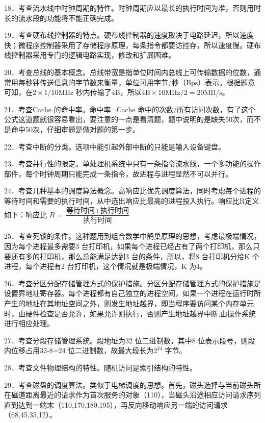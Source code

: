 \documentclass[UTF8,11pt]{ctexart}
\begin{document}
18．考查流水线中时钟周期的特性。时钟周期应以最长的执行时间为准，否则用时长的流水段的功能将不能正确完成。


19．考查硬布线控制器的特点。硬布线控制器的速度取决于电路延迟，所以速度快；微程序控制器采用了存储程序原理，每条指令都要访控存，所以速度慢。硬布线控制器采用专门的逻辑电路实现，修改和扩展困难。


20．考查总线的基本概念。总线带宽是指单位时间内总线上可传输数据的位数，通常用每秒钟传送信息的字节数来衡量，单位可用字节/秒（Bps）表示。根据题意可知，在\(\displaystyle 2\times1/10\text{MHz}\) 秒内传输了4B，所以\(\displaystyle 4\text{B}\times10\text{MHz}/2=20\text{MB/s}\)。


21．考查Cache 的命中率。命中率=Cache 命中的次数/所有访问次数，有了这个公式这道题就很容易看出，要注意的一点是看清题，题中说明的是缺失50次，而不是命中50次，仔细审题是做对题的第一步。


22．考查中断的分类。选项中能引起外部中断的只能是输入设备键盘。


23．考查并行性的限定。单处理机系统中只有一条指令流水线，一个多功能的操作部件，每个时钟周期只能完成一条指令，故进程与进程显然不可以并行。


24．考查几种基本的调度算法概念。高响应比优先调度算法，同时考虑每个进程的等待时间和需要的执行时间，从中选出响应比最高的进程投入执行。响应比R定义如下：响应比 \(\displaystyle R=\dfrac{\displaystyle \text{等待时间}+\text{执行时间}}{\displaystyle \text{执行时间}}\)


25．考查死锁的条件。这种题用到组合数学中鸽巢原理的思想，考虑最极端情况，因为每个进程最多需要3 台打印机，如果每个进程已经占有了两个打印机，那么只要还有多的打印机，那么总能满足达到3 台的条件，所以，将8 台打印机分给K 个进程，每个进程有2 台打印机，这个情况就是极端情况，K 为4。


26．考查分区分配存储管理方式的保护措施。分区分配存储管理方式的保护措施是设置界地址寄存器。每个进程都有自己独立的进程空间，如果一个进程在运行时所产生的地址在其地址空间之外，则发生地址越界，即当程序要访问某个内存单元时，由硬件检查是否允许，如果允许则执行，否则产生地址越界中断,由操作系统进行相应处理。


27．考查分段存储管理系统。段地址为32 位二进制数，其中8 位表示段号，则段内位移占用32-8=24 位二进制数，故最大段长为\(\displaystyle 2^{24}\) 字节。


28．考查文件物理结构的特性。随机访问是索引结构的特性。


29．考查磁盘的调度算法。类似于电梯调度的思想。首先，磁头选择与当前磁头所在磁道距离最近的请求作为首次服务的对象（110），当磁头沿途相应访问请求序列直到达到一端末（110,170,180,195），再反向移动响应另一端的访问请求（68,45,35,12）。
\end{document}
